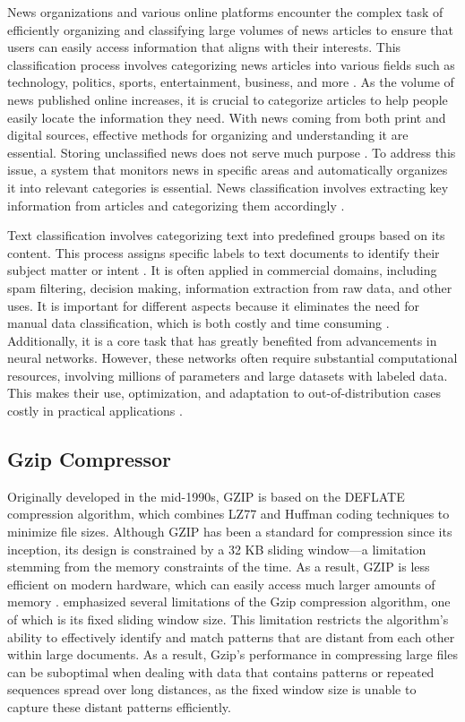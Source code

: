 \documentclass{article}
\begin{document}
News organizations and various online platforms encounter the complex task of efficiently organizing and classifying large volumes of news articles to ensure that users can easily access information that aligns with their interests. This classification process involves categorizing news articles into various fields such as technology, politics, sports, entertainment, business, and more \cite{Volety2024}. As the volume of news published online increases, it is crucial to categorize articles to help people easily locate the information they need. With news coming from both print and digital sources, effective methods for organizing and understanding it are essential. Storing unclassified news does not serve much purpose \cite{Singh2021}. To address this issue, a system that monitors news in specific areas and automatically organizes it into relevant categories is essential. News classification involves extracting key information from articles and categorizing them accordingly \cite{Dogra2022}.

Text classification involves categorizing text into predefined groups based on its content. This process assigns specific labels to text documents to identify their subject matter or intent \cite{Zhang2023}. It is often applied in commercial domains, including spam filtering, decision making, information extraction from raw data, and other uses. It is important for different aspects because it eliminates the need for manual data classification, which is both costly and time consuming \cite{Hassan2022}. Additionally, it is a core task that has greatly benefited from advancements in neural networks. However, these networks often require substantial computational resources, involving millions of parameters and large datasets with labeled data. This makes their use, optimization, and adaptation to out-of-distribution cases costly in practical applications \cite{Peters2023}.

\subsection{Gzip Compressor}

Originally developed in the mid-1990s, GZIP is based on the DEFLATE compression algorithm, which combines LZ77 and Huffman coding techniques to minimize file sizes. Although GZIP has been a standard for compression since its inception, its design is constrained by a 32 KB sliding window—a limitation stemming from the memory constraints of the time. As a result, GZIP is less efficient on modern hardware, which can easily access much larger amounts of memory \cite{Bullock2024}. \cite{Jiang2022} emphasized several limitations of the Gzip compression algorithm, one of which is its fixed sliding window size. This limitation restricts the algorithm's ability to effectively identify and match patterns that are distant from each other within large documents. As a result, Gzip's performance in compressing large files can be suboptimal when dealing with data that contains patterns or repeated sequences spread over long distances, as the fixed window size is unable to capture these distant patterns efficiently.
\end{document}

